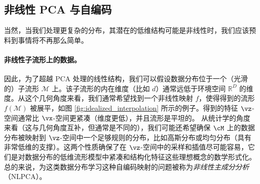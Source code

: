 \documentclass[../../book-main.tex]{subfiles}
\begin{document}
\subsection{非线性 PCA 与自编码}\label{sub:nonlinear-pca}\label{sec:NLPCA}
当然，当我们处理更复杂的分布，其潜在的低维结构可能是非线性时，我们应该预料到事情将不再那么简单。

\paragraph{非线性子流形上的数据。} 因此，为了超越 PCA 处理的线性结构，我们可以假设数据分布位于一个（光滑的）子流形 $\mathcal{M}$ 上。该子流形的内在维度（比如 $d$）通常远低于环境空间 $\mathbb{R}^D$ 的维度。从这个几何角度来看，我们通常希望找到一个非线性映射 $f$，使得得到的流形 $f(\mathcal{M})$ 被展平，如图 \ref{fig:idealized_interpolation} 所示的例子。得到的特征 $\vz$-空间通常比 $\vx$-空间更紧凑（维度更低），并且流形是平坦的。
从统计学的角度来看（这与几何角度互补，但通常是不同的），我们可能还希望确保 $\cM$ 上的数据分布被映射到 $\vz$-空间中一个足够规则的分布，比如高斯分布或均匀分布（具有非常低维的支撑）。这两个性质确保了在 $\vz$-空间中的采样和插值尽可能容易，它们是对数据分布的低维流形模型中紧凑和结构化特征这些理想概念的数学形式化。
总的来说，为这类数据分布学习这种自编码映射的问题被称为{\em 非线性主成分分析}（NLPCA）。
\end{document}
